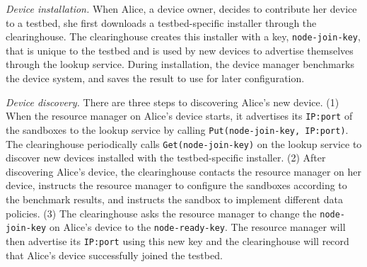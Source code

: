 


\emph{Device installation.} When Alice, a device owner, decides to
contribute her device to a testbed, she first downloads a
testbed-specific installer through the clearinghouse. The
clearinghouse creates this installer with a key, \texttt{node-join-key}, 
that is unique to the testbed and is used by new devices to advertise 
themselves through the lookup service. 
During installation, the device manager benchmarks the device system,
and saves the result to use for later configuration.


\emph{Device discovery.} There are three steps to discovering Alice's
new device. (1) When the resource manager on Alice's device starts, it 
advertises its \texttt{IP:port} of the sandboxes to the lookup service by 
calling \texttt{Put(node-join-key, IP:port)}. The clearinghouse periodically
calls \texttt{Get(node-join-key)} on the lookup service to discover
new devices installed with the testbed-specific installer. (2) After
discovering Alice's device, the clearinghouse contacts the resource
manager on her device, instructs the resource manager to
configure the sandboxes according to the benchmark results, and
instructs the sandbox to implement different data policies.
%
(3) The clearinghouse asks the resource manager to change the
\texttt{\texttt{node-join-key}} on Alice's device to the \texttt{node-ready-key}. 
The resource manager will then advertise its
\texttt{IP:port} using this new key and the clearinghouse will record
that Alice's device successfully joined the testbed.

